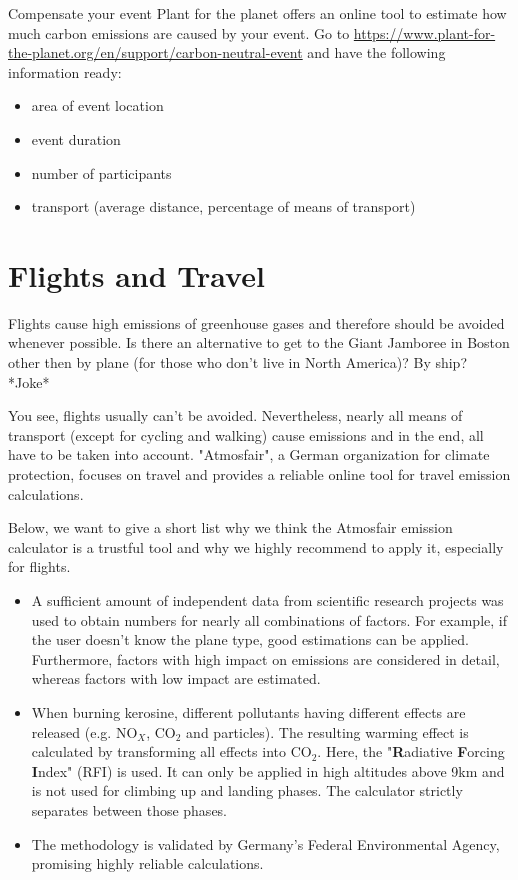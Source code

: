 \begin{suggest} {Compensate your event} %
	Plant for the planet offers an online tool to estimate how much carbon emissions are caused by your event. Go to \url{https://www.plant-for-the-planet.org/en/support/carbon-neutral-event} and have the following information ready:
	\begin{itemize}
		\item area of event location
		\item event duration
		\item number of participants
		\item transport (average distance, percentage of means of transport)
	\end{itemize}
\end{suggest}


\section{Flights and Travel}
Flights cause high emissions of greenhouse gases and therefore should be avoided whenever possible. Is there an alternative to get to the Giant Jamboree in Boston other then by plane (for those who don't live in North America)? By ship? *Joke* 


You see, flights usually can't be avoided. Nevertheless, nearly all means of transport (except for cycling and walking) cause emissions and in the end, all have to be taken into account. 
"Atmosfair", a German organization for climate protection, focuses on travel and provides a reliable online tool for travel emission calculations.


Below, we want to give a short list why we think the Atmosfair emission calculator is a trustful tool and why we highly recommend to apply it, especially for flights. 

\begin{itemize}
	\item A sufficient amount of independent data from scientific research projects was used to obtain numbers for nearly all combinations of factors. For example, if the user doesn't know the plane type, good estimations can be applied. Furthermore, factors with high impact on emissions are considered in detail, whereas factors with low impact are estimated.
	
	\item When burning kerosine, different pollutants having different effects are released (e.g. NO$_X$, CO$_2$ and particles). The resulting warming effect is calculated by transforming all effects into CO$_2$. Here, the "\textbf{R}adiative \textbf{F}orcing \textbf{I}ndex" (RFI) is used. It can only be applied in high altitudes above 9km and is not used for climbing up and landing phases. The calculator strictly separates between those phases.
	
	\item The methodology is validated by Germany's Federal Environmental Agency, promising highly reliable calculations.
\end{itemize}

